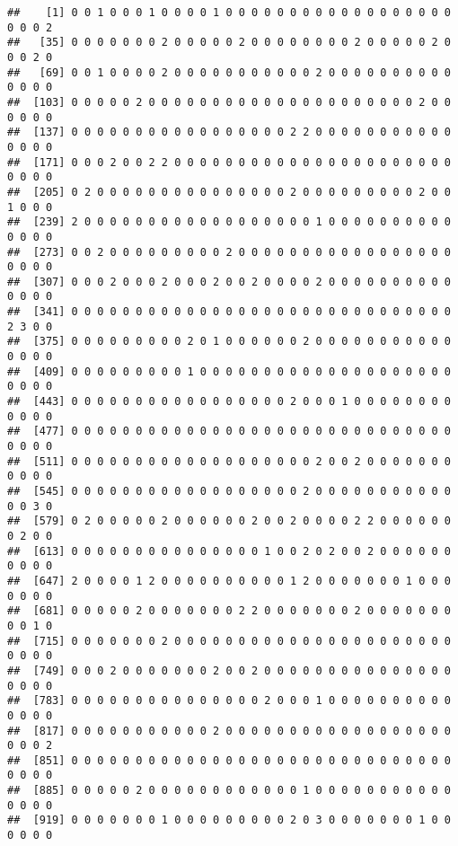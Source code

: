 \documentclass[12pt,]{article}
\newenvironment{Shaded}{\begin{snugshade}}{\end{snugshade}}
\newcommand{\CommentTok}[1]{\textcolor[rgb]{0.56,0.35,0.01}{\textit{#1}}}
\newcommand{\NormalTok}[1]{#1}
\newcommand{\OperatorTok}[1]{\textcolor[rgb]{0.81,0.36,0.00}{\textbf{#1}}}
\begin{document}
\begin{Shaded}
\end{Shaded}

\begin{verbatim}
##    [1] 0 0 1 0 0 0 1 0 0 0 0 1 0 0 0 0 0 0 0 0 0 0 0 0 0 0 0 0 0 0 0 0 0 2
##   [35] 0 0 0 0 0 0 0 2 0 0 0 0 0 2 0 0 0 0 0 0 0 0 2 0 0 0 0 0 2 0 0 0 2 0
##   [69] 0 0 1 0 0 0 0 2 0 0 0 0 0 0 0 0 0 0 0 2 0 0 0 0 0 0 0 0 0 0 0 0 0 0
##  [103] 0 0 0 0 0 2 0 0 0 0 0 0 0 0 0 0 0 0 0 0 0 0 0 0 0 0 0 2 0 0 0 0 0 0
##  [137] 0 0 0 0 0 0 0 0 0 0 0 0 0 0 0 0 0 2 2 0 0 0 0 0 0 0 0 0 0 0 0 0 0 0
##  [171] 0 0 0 2 0 0 2 2 0 0 0 0 0 0 0 0 0 0 0 0 0 0 0 0 0 0 0 0 0 0 0 0 0 0
##  [205] 0 2 0 0 0 0 0 0 0 0 0 0 0 0 0 0 0 2 0 0 0 0 0 0 0 0 0 2 0 0 1 0 0 0
##  [239] 2 0 0 0 0 0 0 0 0 0 0 0 0 0 0 0 0 0 0 1 0 0 0 0 0 0 0 0 0 0 0 0 0 0
##  [273] 0 0 2 0 0 0 0 0 0 0 0 0 2 0 0 0 0 0 0 0 0 0 0 0 0 0 0 0 0 0 0 0 0 0
##  [307] 0 0 0 2 0 0 0 2 0 0 0 2 0 0 2 0 0 0 0 2 0 0 0 0 0 0 0 0 0 0 0 0 0 0
##  [341] 0 0 0 0 0 0 0 0 0 0 0 0 0 0 0 0 0 0 0 0 0 0 0 0 0 0 0 0 0 0 2 3 0 0
##  [375] 0 0 0 0 0 0 0 0 0 2 0 1 0 0 0 0 0 0 2 0 0 0 0 0 0 0 0 0 0 0 0 0 0 0
##  [409] 0 0 0 0 0 0 0 0 0 1 0 0 0 0 0 0 0 0 0 0 0 0 0 0 0 0 0 0 0 0 0 0 0 0
##  [443] 0 0 0 0 0 0 0 0 0 0 0 0 0 0 0 0 0 2 0 0 0 1 0 0 0 0 0 0 0 0 0 0 0 0
##  [477] 0 0 0 0 0 0 0 0 0 0 0 0 0 0 0 0 0 0 0 0 0 0 0 0 0 0 0 0 0 0 0 0 0 0
##  [511] 0 0 0 0 0 0 0 0 0 0 0 0 0 0 0 0 0 0 0 2 0 0 2 0 0 0 0 0 0 0 0 0 0 0
##  [545] 0 0 0 0 0 0 0 0 0 0 0 0 0 0 0 0 0 0 2 0 0 0 0 0 0 0 0 0 0 0 0 0 3 0
##  [579] 0 2 0 0 0 0 0 2 0 0 0 0 0 0 2 0 0 2 0 0 0 0 2 2 0 0 0 0 0 0 0 2 0 0
##  [613] 0 0 0 0 0 0 0 0 0 0 0 0 0 0 0 1 0 0 2 0 2 0 0 2 0 0 0 0 0 0 0 0 0 0
##  [647] 2 0 0 0 0 1 2 0 0 0 0 0 0 0 0 0 0 1 2 0 0 0 0 0 0 0 1 0 0 0 0 0 0 0
##  [681] 0 0 0 0 0 2 0 0 0 0 0 0 0 2 2 0 0 0 0 0 0 0 2 0 0 0 0 0 0 0 0 0 1 0
##  [715] 0 0 0 0 0 0 0 2 0 0 0 0 0 0 0 0 0 0 0 0 0 0 0 0 0 0 0 0 0 0 0 0 0 0
##  [749] 0 0 0 2 0 0 0 0 0 0 0 2 0 0 2 0 0 0 0 0 0 0 0 0 0 0 0 0 0 0 0 0 0 0
##  [783] 0 0 0 0 0 0 0 0 0 0 0 0 0 0 0 2 0 0 0 1 0 0 0 0 0 0 0 0 0 0 0 0 0 0
##  [817] 0 0 0 0 0 0 0 0 0 0 0 2 0 0 0 0 0 0 0 0 0 0 0 0 0 0 0 0 0 0 0 0 0 2
##  [851] 0 0 0 0 0 0 0 0 0 0 0 0 0 0 0 0 0 0 0 0 0 0 0 0 0 0 0 0 0 0 0 0 0 0
##  [885] 0 0 0 0 0 2 0 0 0 0 0 0 0 0 0 0 0 0 1 0 0 0 0 0 0 0 0 0 0 0 0 0 0 0
##  [919] 0 0 0 0 0 0 0 1 0 0 0 0 0 0 0 0 0 2 0 3 0 0 0 0 0 0 0 1 0 0 0 0 0 0

\end{verbatim}
\end{document}
